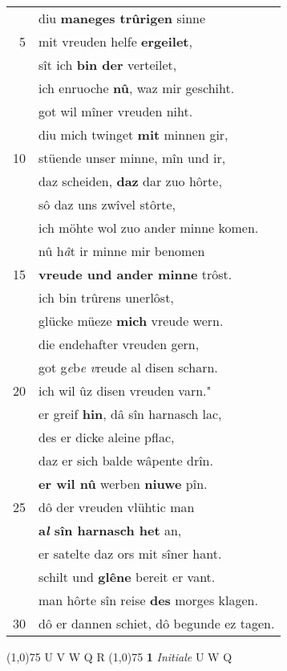 \documentclass[8pt,a4paper,notitlepage]{article}
\begin{document}
\begin{table}[ht]
\begin{minipage}[t]{0.5\linewidth}
\begin{tabular}{rl}
 & diu \textbf{maneges trûrigen} sinne\\ 
5 & mit vreuden helfe \textbf{ergeilet},\\ 
 & sît ich \textbf{bin der} verteilet,\\ 
 & ich enruoche \textbf{nû}, waz mir geschiht.\\ 
 & got wil mîner vreuden niht.\\ 
 & diu mich twinget \textbf{mit} minnen gir,\\ 
10 & stüende unser minne, mîn und ir,\\ 
 & daz scheiden, \textbf{daz} dar zuo hôrte,\\ 
 & sô daz uns zwîvel stôrte,\\ 
 & ich möhte wol zuo ander minne komen.\\ 
 & nû h\textit{â}t ir minne mir benomen\\ 
15 & \textbf{vreude und ander minne} trôst.\\ 
 & ich bin trûrens unerlôst,\\ 
 & glücke müeze \textbf{mich} vreude wern.\\ 
 & die endehafter vreuden gern,\\ 
 & got g\textit{e}b\textit{e} \textit{v}reude al disen scharn.\\ 
20 & ich wil ûz disen vreuden varn."\\ 
 & er greif \textbf{hin}, dâ sîn harnasch lac,\\ 
 & des er dicke aleine pflac,\\ 
 & daz er sich balde wâpente drîn.\\ 
 & \textbf{er wil nû} werben \textbf{niuwe} pîn.\\ 
25 & dô der vreuden vlühtic man\\ 
 & \textbf{a\textit{l} sîn harnasch het} an,\\ 
 & er satelte daz ors mit sîner hant.\\ 
 & schilt und \textbf{glêne} bereit er vant.\\ 
 & man hôrte sîn reise \textbf{des} morges klagen.\\ 
30 & dô er dannen schiet, dô begunde ez tagen.\\ 
\end{tabular}
\scriptsize
\line(1,0){75} \newline
U V W Q R \newline
\line(1,0){75} \newline
\textbf{1} \textit{Initiale} U W Q  \newline

\end{minipage}
\end{table}
\end{document}
